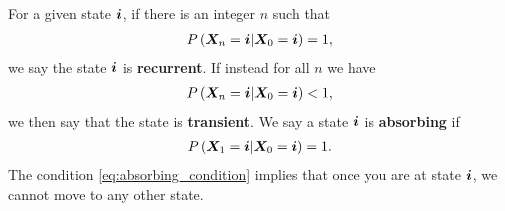 For a given state ${\bm i}$, if there is an integer $n$ such that 
\begin{align}
    P\left({\bm X}_n = {\bm i} | {\bm X}_0 = {\bm i}\right) = 1
    ,
\end{align}
we say the state ${\bm i}$ is \textbf{recurrent}.
If instead for all $n$ we have 
\begin{align}
    P\left({\bm X}_n = {\bm i} | {\bm X}_0 = {\bm i}\right) < 1
    ,
\end{align}
we then say that the state is \textbf{transient}.
We say a state ${\bm i}$ is \textbf{absorbing} if
\begin{align}
    \label{eq:absorbing_condition}
    P\left({\bm X}_1 = {\bm i} | {\bm X}_0 = {\bm i}\right) = 1
    .
\end{align}
The condition \eqref{eq:absorbing_condition} implies that once you are at state ${\bm i}$, we cannot move to any other state.

